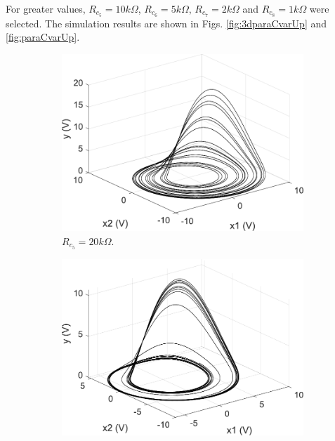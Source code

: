 	For greater values, $R_{c_5}=10k\Omega$, $R_{c_6}=5k\Omega$, $R_{c_7}=2k\Omega$ and $R_{c_8}=1k\Omega$ were selected. The simulation results are shown in Figs. \ref{fig:3dparaCvarUp} and \ref{fig:paraCvarUp}.
	
	\begin{figure}
        \centering
        \begin{subfigure}[b]{0.22\textwidth}
            \centering
            \includegraphics[scale=0.28]{figs/paraCup/3dParaC20.pdf}
            \caption{$R_{c_5} = 20k\Omega$.}    
        \end{subfigure}
        \begin{subfigure}[b]{0.22\textwidth}  
            \centering 
            \includegraphics[scale=0.28]{figs/paraCup/3dParaC25.pdf}

\end{subfigure}
\end{figure}
